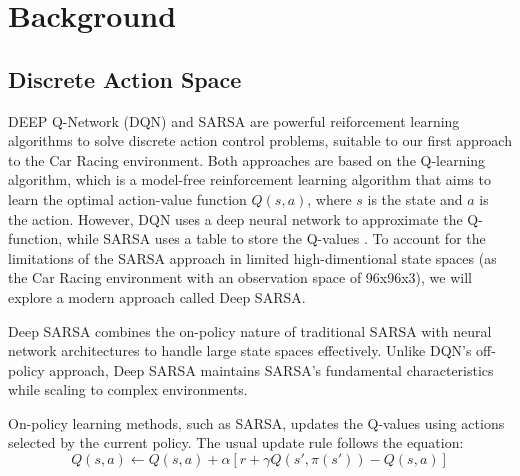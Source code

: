 \documentclass[../CSC_52081_EP.tex]{subfiles}
\begin{document}
    \section{Background}
    \label{sec:background}




    \subsection{Discrete Action Space}

    DEEP Q-Network (DQN) and SARSA are powerful reiforcement learning algorithms to solve discrete action control problems, suitable to our first approach to the Car Racing environment.
    Both approaches are based on the Q-learning algorithm, which is a model-free reinforcement learning algorithm that aims to learn the optimal action-value function $Q(s, a)$, where $s$ is the state and $a$ is the action.
    However, DQN uses a deep neural network to approximate the Q-function, while SARSA uses a table to store the Q-values \cite{Popular_RL}. To account for the limitations of the SARSA approach in limited high-dimentional state spaces (as the Car Racing environment with an observation space of 96x96x3), we will explore a modern approach called Deep SARSA. \cite{Deep_SARSA}

    Deep SARSA combines the on-policy nature of traditional SARSA with neural network architectures to handle large state spaces effectively. Unlike DQN's off-policy approach, Deep SARSA maintains SARSA's fundamental characteristics while scaling to complex environments.

    On-policy learning methods, such as SARSA, updates the Q-values using actions selected by the current policy. The usual update rule follows the equation:
    \begin{equation}
        Q(s, a) \leftarrow Q(s, a) + \alpha \left[ r + \gamma Q(s', \pi(s')) - Q(s, a) \right]
    \end{equation}
\end{document}
